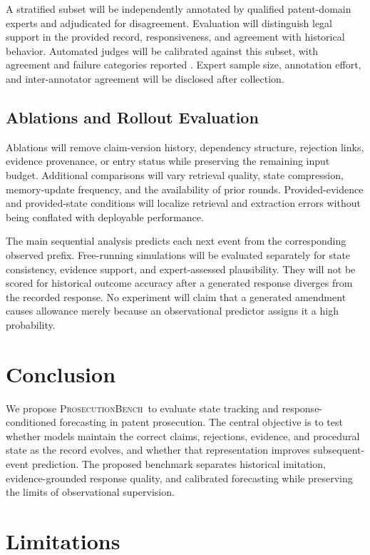 \documentclass[11pt]{article}
\newcommand{\bench}{\textsc{ProsecutionBench}}
\begin{document}
A stratified subset will be independently annotated by qualified patent-domain experts and adjudicated for disagreement. Evaluation will distinguish legal support in the provided record, responsiveness, and agreement with historical behavior. Automated judges will be calibrated against this subset, with agreement and failure categories reported \citep{zheng2023judge}. Expert sample size, annotation effort, and inter-annotator agreement will be disclosed after collection.

\subsection{Ablations and Rollout Evaluation}
\label{sec:exp-ablations}

Ablations will remove claim-version history, dependency structure, rejection links, evidence provenance, or entry status while preserving the remaining input budget. Additional comparisons will vary retrieval quality, state compression, memory-update frequency, and the availability of prior rounds. Provided-evidence and provided-state conditions will localize retrieval and extraction errors without being conflated with deployable performance.

The main sequential analysis predicts each next event from the corresponding observed prefix. Free-running simulations will be evaluated separately for state consistency, evidence support, and expert-assessed plausibility. They will not be scored for historical outcome accuracy after a generated response diverges from the recorded response. No experiment will claim that a generated amendment causes allowance merely because an observational predictor assigns it a high probability.

\section{Conclusion}
\label{sec:conc}

We propose \bench\ to evaluate state tracking and response-conditioned forecasting in patent prosecution. The central objective is to test whether models maintain the correct claims, rejections, evidence, and procedural state as the record evolves, and whether that representation improves subsequent-event prediction. The proposed benchmark separates historical imitation, evidence-grounded response quality, and calibrated forecasting while preserving the limits of observational supervision.

\section*{Limitations}
\end{document}
